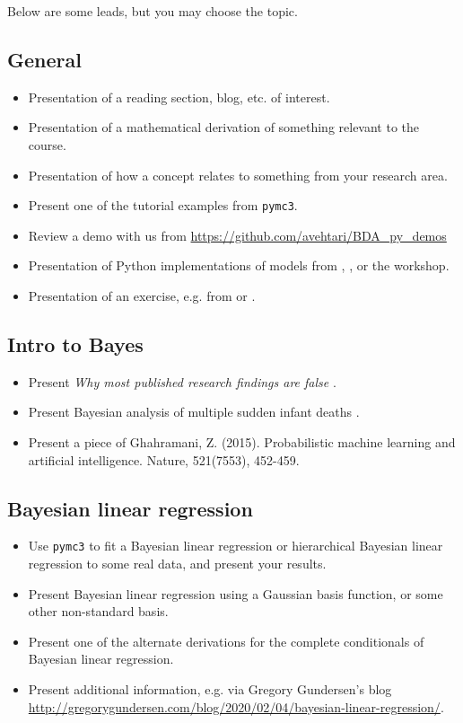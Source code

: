 \documentclass{article} %
\begin{document}
	
Below are some leads, but you may choose the topic.

\subsection{General}
\begin{itemize}
\item Presentation of a reading section,  blog,  etc.  of interest.
\item Presentation of a mathematical derivation of something relevant to the course.
\item Presentation of how a concept relates to something from your research area.
\item Present one of the tutorial examples from \texttt{pymc3}.
\item Review a demo with us from \url{https://github.com/avehtari/BDA_py_demos}
\item Presentation of Python implementations of models from \cite{hoff2009first} ,  \cite{ gelman2013bayesian},  or the workshop.
\item Presentation of an exercise, e.g. from \cite{hoff2009first} or \cite{gelman2013bayesian}.
\end{itemize}

\subsection{Intro to Bayes} 
\begin{itemize}
\item Present \textit{Why most published research findings are false} \cite{ioannidis2005most}.
\item Present Bayesian analysis of multiple sudden infant deaths  \cite{hill2004multiple}.
\item Present a piece of Ghahramani, Z. (2015). Probabilistic machine learning and artificial intelligence. Nature, 521(7553), 452-459.  
\end{itemize}

\subsection{Bayesian linear regression} 
\begin{itemize}
\item Use \texttt{pymc3} to fit a Bayesian linear regression or hierarchical Bayesian linear regression to some real data, and present your results.  
\item Present Bayesian linear regression using a Gaussian basis function, or some other non-standard basis.  
\item Present one of the alternate derivations for the complete conditionals of Bayesian linear regression.
\item Present additional information, e.g. via Gregory Gundersen's blog \url{http://gregorygundersen.com/blog/2020/02/04/bayesian-linear-regression/}.
\end{itemize}
\end{document}
